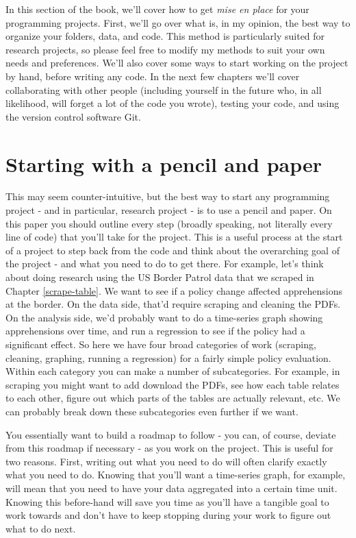 \documentclass[
  12pt,
]{book}
\begin{document}
In this section of the book, we'll cover how to get \emph{mise en place} for your programming projects. First, we'll go over what is, in my opinion, the best way to organize your folders, data, and code. This method is particularly suited for research projects, so please feel free to modify my methods to suit your own needs and preferences. We'll also cover some ways to start working on the project by hand, before writing any code. In the next few chapters we'll cover collaborating with other people (including yourself in the future who, in all likelihood, will forget a lot of the code you wrote), testing your code, and using the version control software Git.

\hypertarget{starting-with-a-pencil-and-paper}{%
\section{Starting with a pencil and paper}\label{starting-with-a-pencil-and-paper}}

This may seem counter-intuitive, but the best way to start any programming project - and in particular, research project - is to use a pencil and paper. On this paper you should outline every step (broadly speaking, not literally every line of code) that you'll take for the project. This is a useful process at the start of a project to step back from the code and think about the overarching goal of the project - and what you need to do to get there. For example, let's think about doing research using the US Border Patrol data that we scraped in Chapter \ref{scrape-table}. We want to see if a policy change affected apprehensions at the border. On the data side, that'd require scraping and cleaning the PDFs. On the analysis side, we'd probably want to do a time-series graph showing apprehensions over time, and run a regression to see if the policy had a significant effect. So here we have four broad categories of work (scraping, cleaning, graphing, running a regression) for a fairly simple policy evaluation. Within each category you can make a number of subcategories. For example, in scraping you might want to add download the PDFs, see how each table relates to each other, figure out which parts of the tables are actually relevant, etc. We can probably break down these subcategories even further if we want.

You essentially want to build a roadmap to follow - you can, of course, deviate from this roadmap if necessary - as you work on the project. This is useful for two reasons. First, writing out what you need to do will often clarify exactly what you need to do. Knowing that you'll want a time-series graph, for example, will mean that you need to have your data aggregated into a certain time unit. Knowing this before-hand will save you time as you'll have a tangible goal to work towards and don't have to keep stopping during your work to figure out what to do next.
\end{document}
